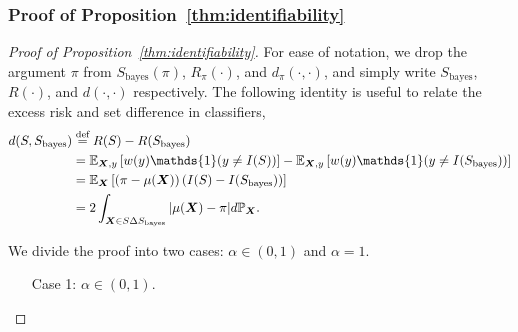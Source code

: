 \documentclass[11pt]{article}
\theoremstyle{plain}
\theoremstyle{definition}
\def\bayesS{S_{\textup{bayes}}}
\begin{document}
\subsubsection{Proof of Proposition~\ref{thm:identifiability}}
\begin{proof}[Proof of Proposition~\ref{thm:identifiability}]
For ease of notation, we drop the argument $\pi$ from $S_{\text{bayes}}(\pi)$, $R_\pi(\cdot)$, and $d_\pi(\cdot,\cdot)$, and simply write $S_{\text{bayes}}$, $R(\cdot)$, and $d(\cdot,\cdot)$ respectively. The following identity is useful to relate the excess risk and set difference in classifiers,
\begin{align}\label{eq:excess}
d(S,\bayesS) &\stackrel{\text{def}}{=} R(S)-R(\bayesS)\\
& = \mathbb{E}_{\mX,y}\left[w(y)\mathds{1}(y\neq I(S))\right]-\mathbb{E}_{\mX,y}\left[w(y)\mathds{1}(y\neq I(\bayesS))\right]\notag \\
&=\mathbb{E}_{\mX}\left[(\pi-\mu(\mX))\left(I(S)-I(\bayesS)\right)\right]\notag \\
&=2\int_{\mX\in S\Delta S_{\text{bayes}}}|\mu(\mX)-\pi|d \mathbb{P}_{\mX}.
\end{align}

We divide the proof into two cases: $\alpha \in (0,1)$ and $\alpha=1$. 
\begin{enumerate}[label={2.\arabic*},wide, labelwidth=!, labelindent=0pt]
\item[Case 1:] $\alpha \in (0,1)$.


\end{enumerate}
\end{proof}
\end{document}
